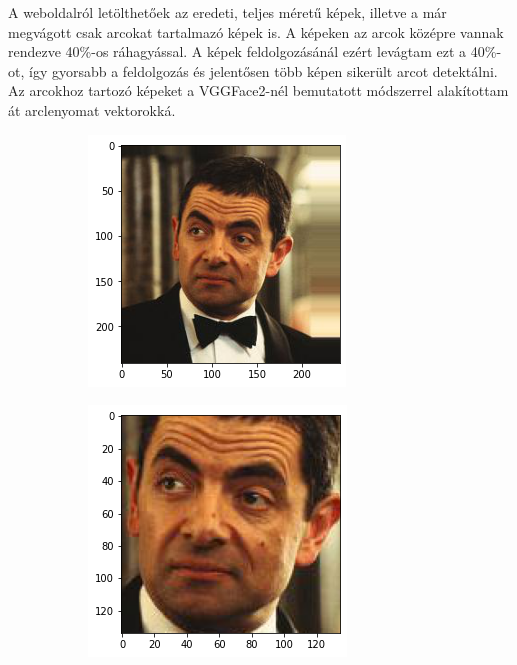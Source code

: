 A weboldalról letölthetőek az eredeti, teljes méretű képek, illetve a már megvágott csak arcokat tartalmazó képek is. A képeken az arcok középre vannak rendezve 40\%-os ráhagyással. A képek feldolgozásánál ezért levágtam ezt a 40\%-ot, így gyorsabb a feldolgozás és jelentősen több képen sikerült arcot detektálni. Az arcokhoz tartozó képeket a VGGFace2-nél bemutatott módszerrel alakítottam át arclenyomat vektorokká.

\begin{figure}[ht]
     \centering
     \begin{subfigure}[b]{0.42\columnwidth}
         \centering
         \includegraphics[width=1\columnwidth]{figures/mrbean.png}
     \end{subfigure}
     \begin{subfigure}[b]{0.42\columnwidth}
         \centering
         \includegraphics[width=1\columnwidth]{figures/mrbean_crop.png}

\end{subfigure}
\end{figure}
